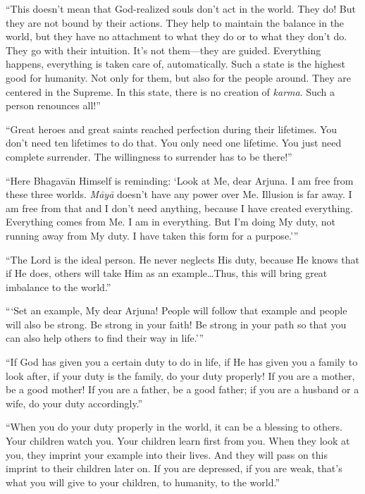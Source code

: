 \enquote{This doesn’t mean that God-realized souls don’t act in the world. They do! But they are not bound by their actions. They help to maintain the balance in the world, but they have no attachment to what they do or to what they don’t do. They go with their intuition. It’s not them---they are guided. Everything happens, everything is taken care of, automatically. Such a state is the highest good for humanity. Not only for them, but also for the people around. They are centered in the Supreme. In this state, there is no creation of \textit{karma}. Such a person renounces all!}


\enquote{Great heroes and great saints reached perfection during their lifetimes. You don’t need ten lifetimes to do that. You only need one lifetime. You just need complete surrender. The willingness to surrender has to be there!}

\enquote{Here Bhagavān Himself is reminding: \enquote{Look at Me, dear Arjuna. I am free from these three worlds. \textit{Māyā} doesn’t have any power over Me. Illusion is far away. I am free from that and I don’t need anything, because I have created everything. Everything comes from Me. I am in everything. But I’m doing My duty, not running away from My duty. I have taken this form for a purpose.}}

\enquote{The Lord is the ideal person. He never neglects His duty, because He knows that if He does, others will take Him as an example\ldots Thus, this will bring great imbalance to the world.}

\enquote{\enquote{Set an example, My dear Arjuna! People will follow that example and people will also be strong. Be strong in your faith! Be strong in your path so that you can also help others to find their way in life.}}

\enquote{If God has given you a certain duty to do in life, if He has given you a family to look after, if your duty is the family, do your duty properly! If you are a mother, be a good mother! If you are a father, be a good father; if you are a husband or a wife, do your duty accordingly.}

\enquote{When you do your duty properly in the world, it can be a blessing to others. Your children watch you. Your children learn first from you. When they look at you, they imprint your example into their lives. And they will pass on this imprint to their children later on. If you are depressed, if you are weak, that’s what you will give to your children, to humanity, to the world.}

